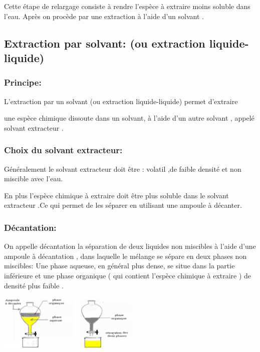 \documentclass[12pt]{article}
\begin{document}
Cette étape de relargage consiste à rendre l'espèce à extraire moins soluble dans l'eau. Après on
procède par une extraction à l'aide d'un solvant .

\subsection{Extraction par solvant: (ou extraction liquide-liquide) }
\subsubsection{Principe:}
L'extraction par un solvant (ou extraction liquide-liquide) permet d'extraire

une espèce chimique dissoute dans un solvant, à l'aide d'un autre solvant , appelé solvant extracteur .

\subsubsection{Choix du solvant extracteur:}
Généralement le solvant extracteur doit être : volatil ,de faible densité et non miscible avec l'eau.

En plus l'espèce chimique à extraire doit être plus soluble dans le solvant extracteur .Ce qui permet de les séparer en
utilisant une ampoule à décanter.

\subsubsection{Décantation:}

On appelle décantation la séparation de deux liquides non miscibles à
l'aide d'une ampoule à décantation , dans laquelle le mélange se sépare en deux phases non miscibles: Une phase
aqueuse, en général plus dense, se situe dans la partie inférieure et une phase organique ( qui contient l'espèce
chimique à extraire ) de densité plus faible .

\begin{center}
	\includegraphics[width=0.5\textwidth]{./img/Extraction_02.png}
\end{center}
\end{document}
